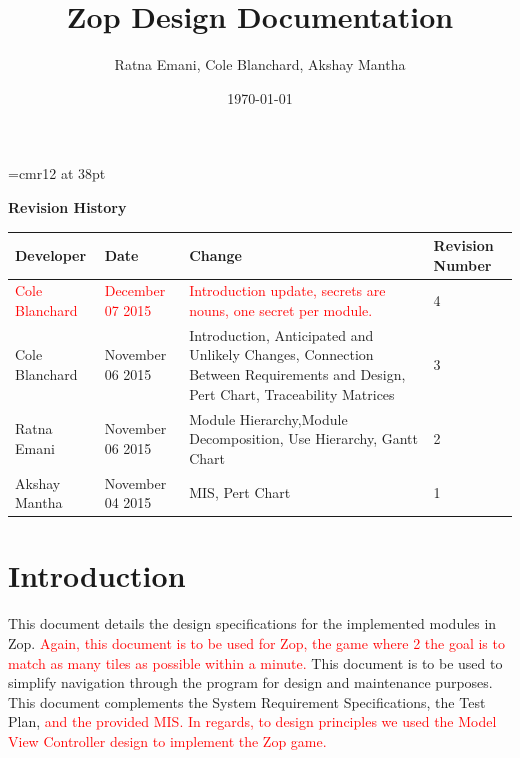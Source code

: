 \documentclass[12pt]{article}
\begin{document}
\begin{titlepage}
\font\myfont=cmr12 at 38pt
\title{\myfont\vspace{60mm}Zop Design Documentation} 
\author{Ratna Emani, Cole Blanchard, Akshay Mantha}
\date{\today}
\maketitle

\end{titlepage}
\newpage
\textbf{Revision History}\\
\begin{center}
 \begin{tabular}{|C{3cm}|C{3cm}|C{3cm}|C{3cm}|}
 \hline
 \textbf{Developer} & \textbf{Date} & \textbf{Change} & \textbf{Revision Number}\\
 \hline \hline
 \textcolor{red}{Cole Blanchard} & \textcolor{red}{December 07 2015} & \textcolor{red}{Introduction update,} \newline \textcolor{red}{secrets are nouns,} \newline \textcolor{red}{one secret per module.} & 4\\
 \hline
 Cole Blanchard & November 06 2015 & Introduction, \newline Anticipated and Unlikely Changes, \newline Connection Between Requirements and Design, \newline Pert Chart, \newline Traceability Matrices & 3\\
 \hline
 Ratna Emani & November 06 2015 & Module Hierarchy,\newline Module Decomposition, \newline Use Hierarchy, \newline Gantt Chart & 2\\
 \hline
 Akshay Mantha & November 04 2015 & MIS, \newline Pert Chart & 1\\
 \hline
 \end{tabular}
\end{center}

\newpage
\tableofcontents
\newpage


\section{Introduction}
This document details the design specifications for the implemented modules in Zop. \textcolor{red}{  Again, this document is to be used for Zop, the game where 2 the goal is to match as many tiles as possible within a minute.}  This document is to be used to simplify navigation through the program for design and maintenance purposes.  This document complements the System Requirement Specifications, the Test Plan, \textcolor{red}{ and the provided MIS.} \textcolor{red}{In regards, to design principles we used the Model View Controller design to implement the Zop game.}
\end{document}
